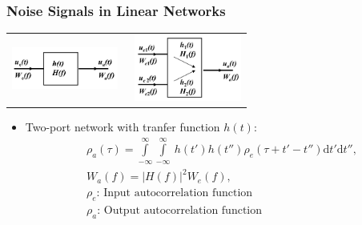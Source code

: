 \subsubsection{Noise Signals in Linear Networks}
\begin{tabular}{cc}
    \includegraphics[width=3.5cm]{content/hfcomp/pictures/2-port_linear_network.png}\
    &\includegraphics[width=3.5cm]{content/hfcomp/pictures/3-port_linear_network.png}\\
\end{tabular}
\begin{itemize}
    \itemsep0pt
    \item Two-port network with tranfer function $h(t)$:
        \begin{align*}
            &\rho_a(\tau) = \int\limits_{-\infty}^\infty\int\limits_{-\infty}^\infty\
            h(t')h(t'')\rho_e(\tau+t'-t'')\mathrm{d}t'\mathrm{d}t'',\\
            &W_a(f) = |H(f)|^2 W_e(f),\\
            &\rho_e\text{: Input autocorrelation function}\\
            &\rho_a\text{: Output autocorrelation function}
        \end{align*}
\end{itemize}
